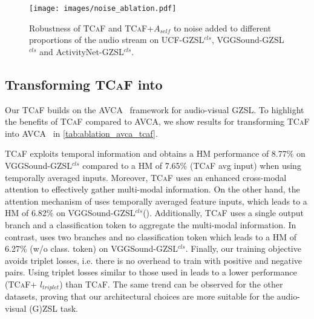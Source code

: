 \documentclass[runningheads]{llncs}
\newcommand{\modelName}{\textsc{TCaF}\xspace}
\newcommand{\activity}{{ActivityNet-GZSL$^{cls}$}\xspace}
\newcommand{\ucf}{{UCF-GZSL$^{cls}$}\xspace}
\newcommand{\vgg}{{VGGSound-GZSL$^{cls}$}\xspace}
\begin{document}
\begin{figure}{}{}
  \begin{center}
     \texttt{[image: images/noise\_ablation.pdf]}
  \end{center}
  \caption{Robustness of \modelName and \modelName+$A_{self}$ to noise added to different proportions of the audio stream on \ucf, \vgg and \activity.}\label{fig:supp_audiowithnoise_ucf}
\end{figure}




\subsection{Transforming \modelName into \cite{mercea2022}}
\label{section:tcaf_to_avca}
Our \modelName builds on the AVCA~\cite{mercea2022} framework for audio-visual GZSL. To highlight the benefits of \modelName compared to AVCA, we show results for transforming \modelName into AVCA~\cite{mercea2022} in \cref{tab:ablation_avca_tcaf}. 

\modelName exploits temporal information and obtains a HM performance of 8.77\% on \vgg compared to a HM of 7.65\% (\modelName avg input) when using temporally averaged inputs. Moreover, \modelName uses an enhanced cross-modal attention to effectively gather multi-modal information. On the other hand, the attention mechanism of \cite{mercea2022} uses temporally averaged feature inputs, which leads to a HM of 6.82\% on \vgg (\cite{mercea2022}). Additionally, \modelName uses a single output branch and a classification token to aggregate the multi-modal information. In contrast, \cite{mercea2022} uses two branches and no classification token which leads to a HM of 6.27\% (w/o class. token) on \vgg. Finally, our training objective avoids triplet losses, i.e. there is no overhead to train with positive and negative pairs. Using triplet losses similar to those used in \cite{mercea2022} leads to a lower performance (\modelName + $l_{triplet}$) than \modelName.
The same trend can be observed for the other datasets, proving that our architectural choices are more suitable for the audio-visual (G)ZSL task.
\end{document}
